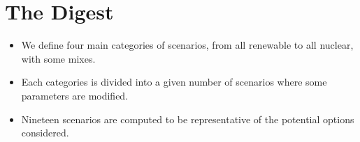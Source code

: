 \section{The Digest}


\begin{kaoboxgreen}[frametitle=Main Takeaways]

\begin{itemize}
\item We define four main categories of scenarios, from all renewable to all nuclear, with some mixes.
\item Each categories is divided into a given number of scenarios where some parameters are modified.
\item Nineteen scenarios are computed to be representative of the potential options considered.
\end{itemize}
  
\end{kaoboxgreen}
























